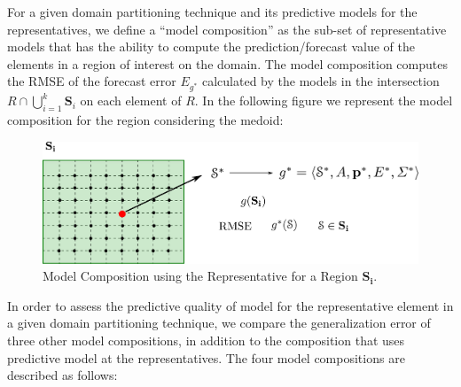 For a given domain partitioning technique and its predictive models for the representatives, we define a ``model composition'' as the sub-set of representative models that has the ability to compute the prediction/forecast value of the elements in a region of interest on the domain. 
The model composition computes the RMSE of the forecast error $E_{g^{*}}$ calculated by the models in the intersection $R \cap \bigcup_{i=1}^{k} \mathbf{S}_{i}$ on each element of $R$.  In the following figure we represent the model composition for the region considering the medoid:
\begin{figure}[h]
	\centering
	\includegraphics[scale=0.35]{../Figures/ModelCompositionRegion}
	\caption{Model Composition using the Representative for a Region $\mathbf{S_{i}}$.}
	\label{Fig:ModelRegion}
\end{figure}

In order to assess the predictive quality of model for the representative element in a given domain partitioning  technique, we compare the generalization error of three other model compositions, in addition to the composition that uses predictive model at the representatives. The four model compositions are described as follows: %

